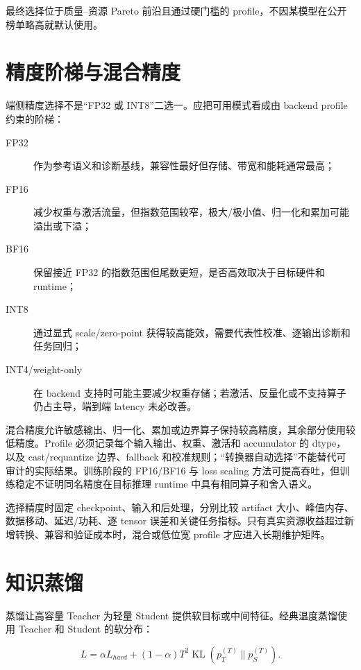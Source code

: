 最终选择位于质量--资源 Pareto 前沿且通过硬门槛的 profile，不因某模型在公开榜单略高就默认使用。

\section{精度阶梯与混合精度}

端侧精度选择不是“FP32 或 INT8”二选一。应把可用模式看成由 backend profile 约束的阶梯：

\begin{description}
  \item[FP32] 作为参考语义和诊断基线，兼容性最好但存储、带宽和能耗通常最高；
  \item[FP16] 减少权重与激活流量，但指数范围较窄，极大/极小值、归一化和累加可能溢出或下溢；
  \item[BF16] 保留接近 FP32 的指数范围但尾数更短，是否高效取决于目标硬件和 runtime；
  \item[INT8] 通过显式 scale/zero-point 获得较高能效，需要代表性校准、逐输出诊断和任务回归；
  \item[INT4/weight-only] 在 backend 支持时可能主要减少权重存储；若激活、反量化或不支持算子仍占主导，端到端 latency 未必改善。
\end{description}

混合精度允许敏感输出、归一化、累加或边界算子保持较高精度，其余部分使用较低精度。Profile 必须记录每个输入输出、权重、激活和 accumulator 的 dtype，以及 cast/requantize 边界、fallback 和校准规则；“转换器自动选择”不能替代可审计的实际结果。训练阶段的 FP16/BF16 与 loss scaling 方法可提高吞吐\cite{mixed-precision-training}，但训练稳定不证明同名精度在目标推理 runtime 中具有相同算子和舍入语义。

选择精度时固定 checkpoint、输入和后处理，分别比较 artifact 大小、峰值内存、数据移动、延迟/功耗、逐 tensor 误差和关键任务指标。只有真实资源收益超过新增转换、兼容和验证成本时，混合或低位宽 profile 才应进入长期维护矩阵。

\section{知识蒸馏}

蒸馏让高容量 Teacher 为轻量 Student 提供软目标或中间特征。经典温度蒸馏使用 Teacher 和 Student 的软分布\cite{knowledge-distillation}：

\begin{equation}
  L=\alpha L_{hard}+(1-\alpha)T^2
  \operatorname{KL}\left(p_T^{(T)}\parallel p_S^{(T)}\right).
\end{equation}

